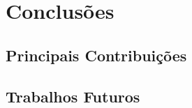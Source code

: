 \chapter[Conclusões]{Conclusões}


\section{Principais Contribuições}

\section{Trabalhos Futuros}

